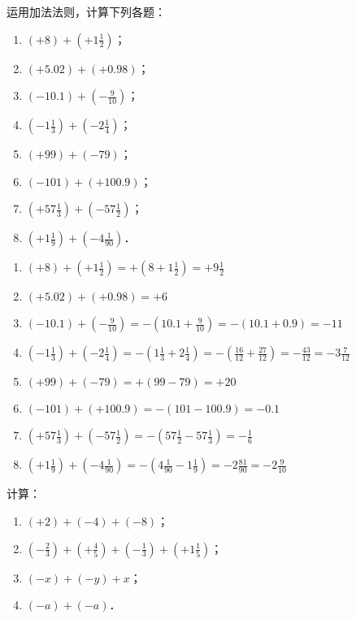 \begin{example}
    运用加法法则，计算下列各题：
    \begin{multicols}{2}
        \begin{enumerate}
    \item $(+8)+\left(+1\frac{1}{2}\right)$；
    \item $(+5.02)+\left(+0.98\right)$；
    \item $(-10.1)+\left(-\frac{9}{10}\right)$；
    \item $\left(-1\frac{1}{3}\right)+\left(-2\frac{1}{4}\right)$；
    \item $(+99)+(-79)$；
    \item $(-101)+(+100.9)$；
    \item $(+57\frac{1}{3})+\left(-57\frac{1}{2}\right)$；
    \item $\left(+1\frac{1}{9}\right)+\left(-4\frac{1}{90}\right)$．
\end{enumerate}
    \end{multicols}
\end{example}    
    
\begin{solution}
\begin{enumerate}
    \item $(+8)+\left(+1\frac{1}{2}\right)=+\left(8+1\frac{1}{2}\right)=+9\frac{1}{2}$
    \item $(+5.02)+\left(+0.98\right)=+6$
    \item $(-10.1)+\left(-\frac{9}{10}\right)=-\left(10.1+\frac{9}{10}\right)=-(10.1+0.9)=-11$
    \item $\left(-1\frac{1}{3}\right)+\left(-2\frac{1}{4}\right)=-\left(1\frac{1}{3}+2\frac{1}{4}\right)=-\left(\frac{16}{12}+\frac{27}{12}\right)=-\frac{43}{12}=-3\frac{7}{12}$
    \item $(+99)+(-79)=+(99-79)=+20$
    \item $(-101)+(+100.9)=-(101-100.9)=-0.1$
    \item $(+57\frac{1}{3})+\left(-57\frac{1}{2}\right)=-\left(57\frac{1}{2}-57\frac{1}{3}\right)=-\frac{1}{6}$
    \item $\left(+1\frac{1}{9}\right)+\left(-4\frac{1}{90}\right)=-\left(4\frac{1}{90}-1\frac{1}{9}\right)=-2\frac{81}{90}=-2\frac{9}{10}$
    
\end{enumerate}

\end{solution}

\begin{example}
计算：
\begin{enumerate}
    \item $(+2)+(-4)+(-8)$；
    \item $\left(-\frac{2}{3}\right)+\left(+\frac{4}{5}\right)+\left(-\frac{1}{3}\right)+\left(+1\frac{1}{5}\right)$；
    \item $(-x)+(-y)+x$；
    \item $(-a)+(-a)$．
\end{enumerate}
\end{example}

